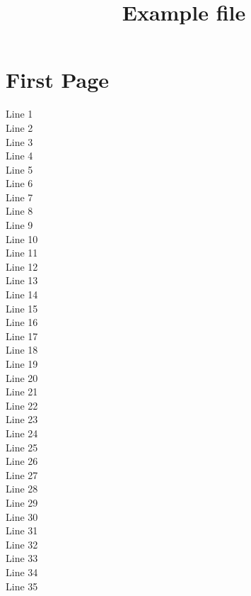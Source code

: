 \documentclass[10pt,english,a4paper,oneside]{amsart}
\begin{document}
\title{Example file}
\maketitle

\section{First Page}
Line 1 \\
Line 2 \\
Line 3 \\
Line 4 \\
Line 5 \\
Line 6 \\
Line 7 \\
Line 8 \\
Line 9 \\
Line 10 \\
Line 11 \\
Line 12 \\
Line 13 \\
Line 14 \\
Line 15 \\
Line 16 \\
Line 17 \\
Line 18 \\
Line 19 \\
Line 20 \\
Line 21 \\
Line 22 \\
Line 23 \\
Line 24 \\
Line 25 \\
Line 26 \\
Line 27 \\
Line 28 \\
Line 29 \\
Line 30 \\
Line 31 \\
Line 32 \\
Line 33 \\
Line 34 \\
Line 35 \\

\newpage
\end{document}
